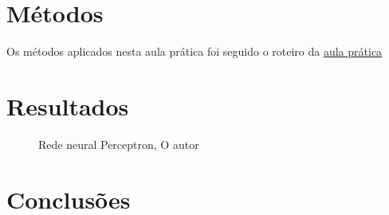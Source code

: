 \section{Métodos}
\par Os métodos aplicados nesta aula prática foi seguido o roteiro da \href{https://github.com/OgliariNatan/neuralPerceptron/blob/main/Aula%20pr%C3%A1tica.pdf}{aula prática}




\section{Resultados}

\begin{figure}[H] %
  \center

  \caption{Rede neural Perceptron, O autor}\label{fig:redeNeural}
\end{figure}

\section{Conclusões}




